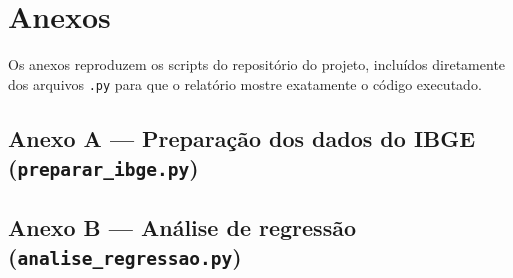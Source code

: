 \documentclass[12pt,a4paper]{article}
\begin{document}
	\newpage
	
	\section{Anexos}
	
	Os anexos reproduzem os scripts do repositório do projeto, incluídos diretamente dos arquivos \texttt{.py} para que o relatório mostre exatamente o código executado.
	
	\subsection*{Anexo A --- Preparação dos dados do IBGE (\texttt{preparar\_ibge.py})}
	
	
	\newpage
	\subsection*{Anexo B --- Análise de regressão (\texttt{analise\_regressao.py})}
	
	
\end{document}
